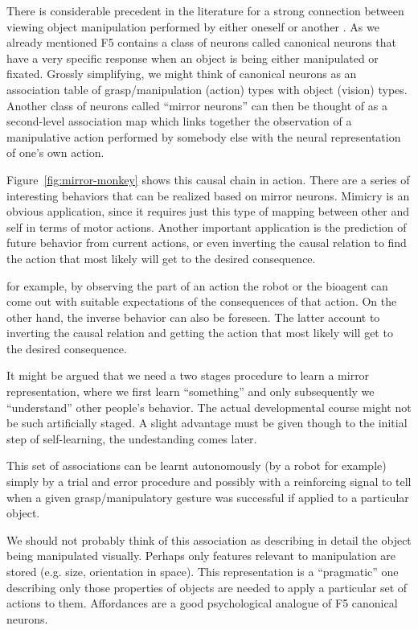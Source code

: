 There is considerable precedent in the literature for a strong
connection between viewing object manipulation performed by either
oneself or another \cite{wohlsclager02human}.  As we already mentioned
F5 contains a class of neurons called canonical neurons that have a
very specific response when an object is being either manipulated or
fixated.  Grossly simplifying, we might think of canonical neurons as
an association table of grasp/manipulation (action) types with object
(vision) types.  Another class of neurons called ``mirror neurons''
can then be thought of as a second-level association map which links
together the observation of a manipulative action performed by
somebody else with the neural representation of one's own action.

Figure~\ref{fig:mirror-monkey} shows this causal chain in action.
There are a series of interesting behaviors that can be realized based
on mirror neurons. Mimicry is an obvious application, since it
requires just this type of mapping between other and self in terms of
motor actions.  Another important application is the prediction of
future behavior from current actions, or even inverting the causal
relation to find the action that most likely will get to the desired
consequence.

\ifverbose

for example, by observing the part of an action the robot or the
bioagent can come out with suitable expectations of the consequences
of that action. On the other hand, the inverse behavior can also be
foreseen. The latter account to inverting the causal relation and
getting the action that most likely will get to the desired
consequence.

It might be argued that we need a two stages procedure to learn a
mirror representation, where we first learn ``something'' and only
subsequently we ``understand'' other people's behavior. The actual
developmental course might not be such artificially staged. A slight
advantage must be given though to the initial step of self-learning,
the undestanding comes later.


This set of associations can be learnt autonomously (by a robot for
example) simply by a trial and error procedure and possibly with a
reinforcing signal to tell when a given grasp/manipulatory gesture was
successful if applied to a particular object.

We should not probably think of this association as describing in
detail the object being manipulated visually. Perhaps only features
relevant to manipulation are stored (e.g. size, orientation in space).
This representation is a ``pragmatic'' one describing only those
properties of objects are needed to apply a particular set of actions
to them. Affordances are a good psychological analogue of F5
canonical neurons.
\fi


